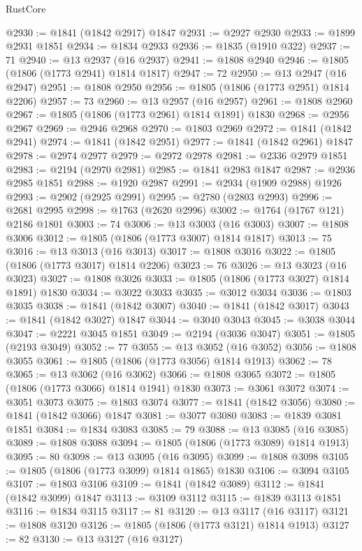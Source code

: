\begin{lexlean}{RustCore}
\begin{coremodule}
@2930 := @1841 (@1842 @2917) @1847
@2931 := @2927 @2930
@2933 := @1899 @2931 @1851
@2934 := @1834 @2933
@2936 := @1835 (@1910 @322)
@2937 := 71
@2940 := @13 @2937 (@16 @2937)
@2941 := @1808 @2940
@2946 := @1805 (@1806 (@1773 @2941) @1814 @1817)
@2947 := 72
@2950 := @13 @2947 (@16 @2947)
@2951 := @1808 @2950
@2956 := @1805 (@1806 (@1773 @2951) @1814 @2206)
@2957 := 73
@2960 := @13 @2957 (@16 @2957)
@2961 := @1808 @2960
@2967 := @1805 (@1806 (@1773 @2961) @1814 @1891) @1830
@2968 := @2956 @2967
@2969 := @2946 @2968
@2970 := @1803 @2969
@2972 := @1841 (@1842 @2941)
@2974 := @1841 (@1842 @2951)
@2977 := @1841 (@1842 @2961) @1847
@2978 := @2974 @2977
@2979 := @2972 @2978
@2981 := @2336 @2979 @1851
@2983 := @2194 (@2970 @2981)
@2985 := @1841 @2983 @1847
@2987 := @2936 @2985 @1851
@2988 := @1920 @2987
@2991 := @2934 (@1909 @2988) @1926
@2993 := @2902 (@2925 @2991)
@2995 := @2780 (@2803 @2993)
@2996 := @2681 @2995
@2998 := @1763 (@2620 @2996)
@3002 := @1764 (@1767 @121) @2186 @1801
@3003 := 74
@3006 := @13 @3003 (@16 @3003)
@3007 := @1808 @3006
@3012 := @1805 (@1806 (@1773 @3007) @1814 @1817)
@3013 := 75
@3016 := @13 @3013 (@16 @3013)
@3017 := @1808 @3016
@3022 := @1805 (@1806 (@1773 @3017) @1814 @2206)
@3023 := 76
@3026 := @13 @3023 (@16 @3023)
@3027 := @1808 @3026
@3033 := @1805 (@1806 (@1773 @3027) @1814 @1891) @1830
@3034 := @3022 @3033
@3035 := @3012 @3034
@3036 := @1803 @3035
@3038 := @1841 (@1842 @3007)
@3040 := @1841 (@1842 @3017)
@3043 := @1841 (@1842 @3027) @1847
@3044 := @3040 @3043
@3045 := @3038 @3044
@3047 := @2221 @3045 @1851
@3049 := @2194 (@3036 @3047)
@3051 := @1805 (@2193 @3049)
@3052 := 77
@3055 := @13 @3052 (@16 @3052)
@3056 := @1808 @3055
@3061 := @1805 (@1806 (@1773 @3056) @1814 @1913)
@3062 := 78
@3065 := @13 @3062 (@16 @3062)
@3066 := @1808 @3065
@3072 := @1805 (@1806 (@1773 @3066) @1814 @1941) @1830
@3073 := @3061 @3072
@3074 := @3051 @3073
@3075 := @1803 @3074
@3077 := @1841 (@1842 @3056)
@3080 := @1841 (@1842 @3066) @1847
@3081 := @3077 @3080
@3083 := @1839 @3081 @1851
@3084 := @1834 @3083
@3085 := 79
@3088 := @13 @3085 (@16 @3085)
@3089 := @1808 @3088
@3094 := @1805 (@1806 (@1773 @3089) @1814 @1913)
@3095 := 80
@3098 := @13 @3095 (@16 @3095)
@3099 := @1808 @3098
@3105 := @1805 (@1806 (@1773 @3099) @1814 @1865) @1830
@3106 := @3094 @3105
@3107 := @1803 @3106
@3109 := @1841 (@1842 @3089)
@3112 := @1841 (@1842 @3099) @1847
@3113 := @3109 @3112
@3115 := @1839 @3113 @1851
@3116 := @1834 @3115
@3117 := 81
@3120 := @13 @3117 (@16 @3117)
@3121 := @1808 @3120
@3126 := @1805 (@1806 (@1773 @3121) @1814 @1913)
@3127 := 82
@3130 := @13 @3127 (@16 @3127)

\end{coremodule}
\end{lexlean}
